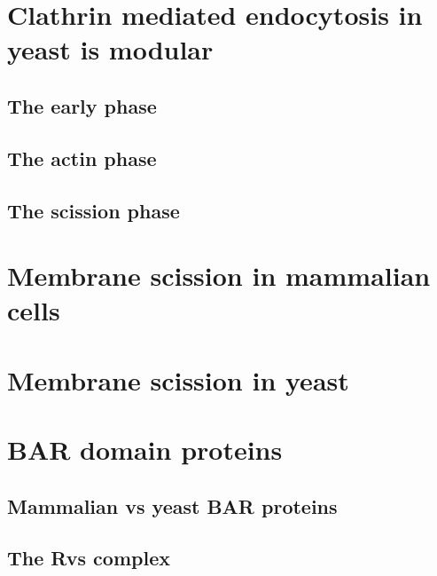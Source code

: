 	
	\section{Clathrin mediated endocytosis in yeast is modular}
		\subsection{The early phase}
		\subsection{The actin phase}
		\subsection{The scission phase}
		
		
	\section{Membrane scission in mammalian cells}
	\section{Membrane scission in yeast}
	
		
	\section{BAR domain proteins}
		\subsection{Mammalian vs yeast BAR proteins}
		\subsection{The Rvs complex}		
		
		
	
